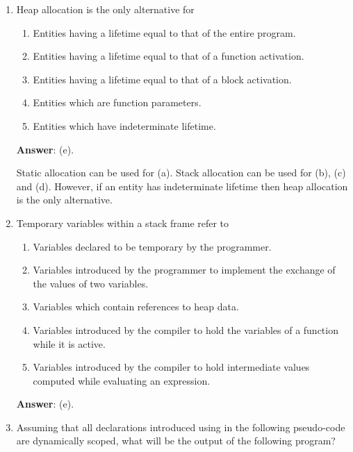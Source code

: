 \documentclass[12pt]{article}
\begin{document}
\begin{enumerate}
\item Heap allocation is the only alternative for

\begin{enumerate}

\item Entities having a lifetime equal to that of the entire
  program.

\item Entities having a lifetime equal to that of a function activation.

\item Entities having a lifetime equal to that of a block activation.

\item Entities which are function parameters.

\item Entities which have indeterminate lifetime.

\end{enumerate}

\textbf{Answer}: (e).

Static allocation can be used for (a).  Stack allocation can be used
for (b), (c) and (d).  However, if an entity has indeterminate
lifetime then heap allocation is the only alternative.


\item Temporary variables within a stack frame refer to

\begin{enumerate}

  \item Variables declared to be temporary by the programmer.

  \item Variables introduced by the programmer to implement the
    exchange of the values of two variables.

  \item Variables which contain references to heap data.

  \item Variables introduced by the compiler to hold
    the variables of a function while it is active.

  \item Variables introduced by the compiler to hold intermediate
    values computed while evaluating an expression.
         
    
\end{enumerate}
\textbf{Answer}: (e).

\item Assuming that all declarations introduced using \verb@var@ in
  the following pseudo-code are dynamically scoped, what will be
  the output of the following program?


\end{enumerate}
\end{document}
